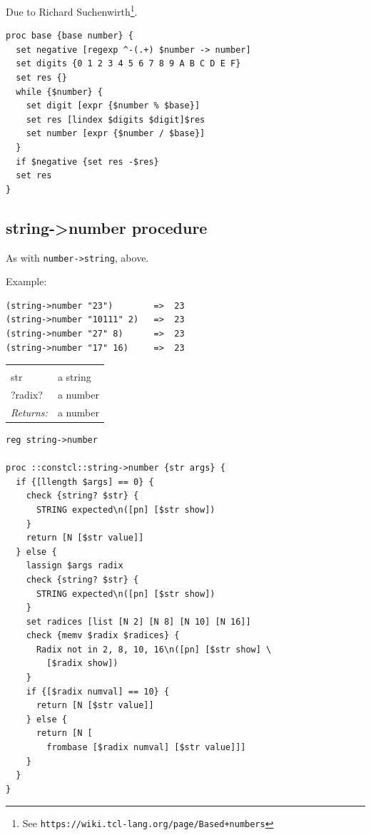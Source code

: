 \documentclass[twoside,9pt]{report}
\begin{document}
Due to Richard Suchenwirth\footnote{See \texttt{https://wiki.tcl-lang.org/page/Based+numbers}}.

\begin{lstlisting}
proc base {base number} {
  set negative [regexp ^-(.+) $number -> number]
  set digits {0 1 2 3 4 5 6 7 8 9 A B C D E F}
  set res {}
  while {$number} {
    set digit [expr {$number % $base}]
    set res [lindex $digits $digit]$res
    set number [expr {$number / $base}]
  }
  if $negative {set res -$res}
  set res
}
\end{lstlisting}
\subsection{string->number procedure}
\label{string->number-procedure}


As with \texttt{number->string}, above.



Example:

\begin{verbatim}
(string->number "23")        =>  23
(string->number "10111" 2)   =>  23
(string->number "27" 8)      =>  23
(string->number "17" 16)     =>  23
\end{verbatim}
\noindent\begin{tabular}{ |p{1.5cm} p{8cm}| }
\hline
\rowcolor[HTML]{CCCCCC} \multicolumn{2}{|l|}{\bf string->number (public)} \\
str & a string \\
?radix? & a number \\
\textit{Returns:} & a number \\
\hline
\end{tabular}
\begin{lstlisting}
reg string->number
 
proc ::constcl::string->number {str args} {
  if {[llength $args] == 0} {
    check {string? $str} {
      STRING expected\n([pn] [$str show])
    }
    return [N [$str value]]
  } else {
    lassign $args radix
    check {string? $str} {
      STRING expected\n([pn] [$str show])
    }
    set radices [list [N 2] [N 8] [N 10] [N 16]]
    check {memv $radix $radices} {
      Radix not in 2, 8, 10, 16\n([pn] [$str show] \
        [$radix show])
    }
    if {[$radix numval] == 10} {
      return [N [$str value]]
    } else {
      return [N [
        frombase [$radix numval] [$str value]]]
    }
  }
}
\end{lstlisting}
\end{document}
